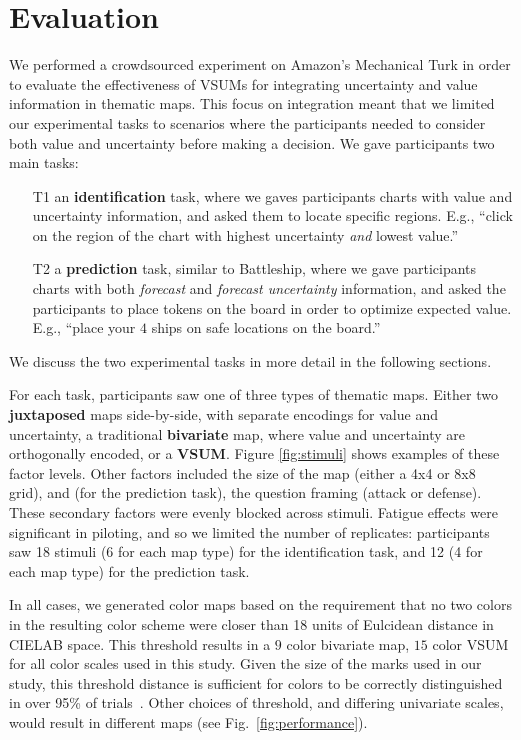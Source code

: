 \documentclass{vgtc}                          %
\begin{document}
\section{Evaluation}

\conditionFig

We performed a crowdsourced experiment on Amazon's Mechanical Turk in order to evaluate the effectiveness of VSUMs for integrating uncertainty and value information in thematic maps. This focus on integration meant that we limited our experimental tasks to scenarios where the participants needed to consider both value and uncertainty before making a decision. We gave participants two main tasks:

\begin{enumerate}
	\item [T1] an \textbf{identification} task, where we gaves participants charts with value and uncertainty information, and asked them to locate specific regions. E.g., ``click on the region of the chart with highest uncertainty \emph{and} lowest value.''
	\item [T2] a \textbf{prediction} task, similar to Battleship, where we gave participants charts with both \emph{forecast} and \emph{forecast uncertainty} information, and asked the participants to place tokens on the board in order to optimize expected value. E.g., ``place your $4$ ships on safe locations on the board.''
\end{enumerate}

We discuss the two experimental tasks in more detail in the following sections.

For each task, participants saw one of three types of thematic maps. Either two \textbf{juxtaposed} maps side-by-side, with separate encodings for value and uncertainty, a traditional \textbf{bivariate} map, where value and uncertainty are orthogonally encoded, or a \textbf{VSUM}. Figure \ref{fig:stimuli} shows examples of these factor levels. Other factors included the size of the map (either a 4x4 or 8x8 grid), and (for the prediction task), the question framing (attack or defense). These secondary factors were evenly blocked across stimuli. Fatigue effects were significant in piloting, and so we limited the number of replicates: participants saw 18 stimuli (6 for each map type) for the identification task, and 12 (4 for each map type) for the prediction task. 

In all cases, we generated color maps based on the requirement that no two colors in the resulting color scheme were closer than 18 units of Eulcidean distance in CIELAB space. This threshold results in a $9$ color bivariate map, $15$ color VSUM for all color scales used in this study. Given the size of the marks used in our study, this threshold distance is sufficient for colors to be correctly distinguished in over 95\% of trials~\cite{stone2014engineering}. Other choices of threshold, and differing univariate scales, would result in different maps (see Fig.~\ref{fig:performance}). 
\end{document}
